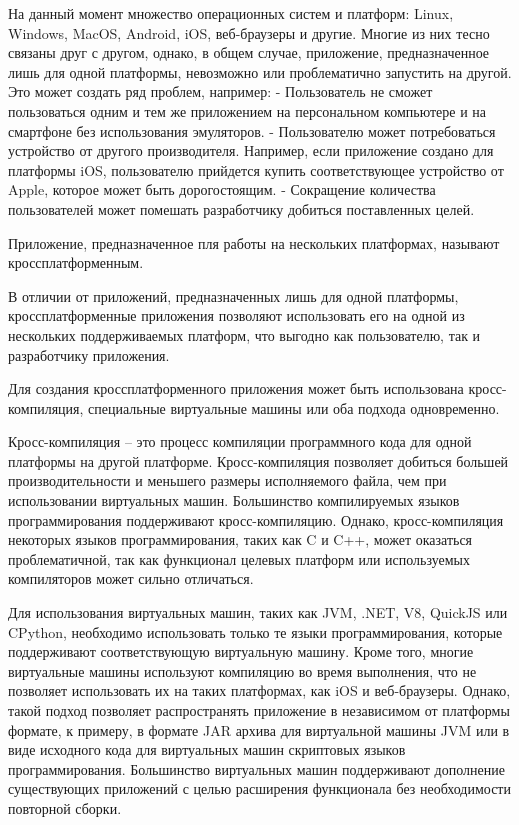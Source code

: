 На данный момент множество операционных систем и платформ: Linux, Windows, MacOS, Android, iOS, веб-браузеры и другие.
Многие из них тесно связаны друг с другом, однако, в общем случае, приложение, предназначенное лишь для одной платформы, невозможно или проблематично запустить на другой.
Это может создать ряд проблем, например:
- Пользователь не сможет пользоваться одним и тем же приложением на персональном компьютере и на смартфоне без использования эмуляторов.
- Пользователю может потребоваться устройство от другого производителя. Например, если приложение создано для платформы iOS, пользователю прийдется купить соответствующее устройство от Apple, которое может быть дорогостоящим.
- Сокращение количества пользователей может помешать разработчику добиться поставленных целей.

Приложение, предназначенное пля работы на нескольких платформах, называют кроссплатформенным.

В отличии от приложений, предназначенных лишь для одной платформы, кроссплатформенные приложения позволяют использовать его на одной из нескольких поддерживаемых платформ, что выгодно как пользователю, так и разработчику приложения.

Для создания кроссплатформенного приложения может быть использована кросс-компиляция, специальные виртуальные машины или оба подхода одновременно. 

Кросс-компиляция -- это процесс компиляции программного кода для одной платформы на другой платформе.
Кросс-компиляция позволяет добиться большей производительности и меньшего размеры исполняемого файла, чем при использовании виртуальных машин.
Большинство компилируемых языков программирования поддерживают кросс-компиляцию.
Однако, кросс-компиляция некоторых языков программирования, таких как C и C++, может оказаться проблематичной, так как функционал целевых платформ или используемых компиляторов может сильно отличаться.

Для использования виртуальных машин, таких как JVM, .NET, V8, QuickJS или CPython, необходимо использовать только те языки программирования, которые поддерживают соответствующую виртуальную машину.
Кроме того, многие виртуальные машины используют компиляцию во время выполнения, что не позволяет использовать их на таких платформах, как iOS и веб-браузеры.
Однако, такой подход позволяет распространять приложение в независимом от платформы формате, к примеру, в формате JAR архива для виртуальной машины JVM или в виде исходного кода для виртуальных машин скриптовых языков программирования.
Большинство виртуальных машин поддерживают дополнение существующих приложений с целью расширения функционала без необходимости повторной сборки.

